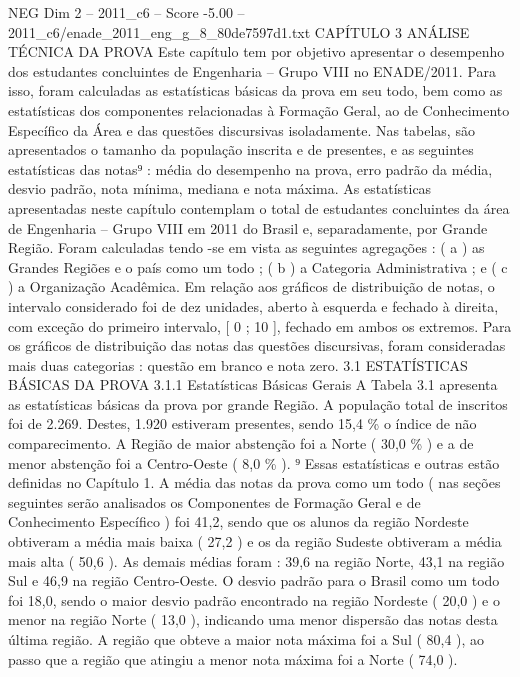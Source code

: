 \begin{textsample}{NEG Dim 2 – 2011\_c6 – Score -5.00 – 2011\_c6/enade\_2011\_eng\_g\_8\_80de7597d1.txt}  \label{ex:f2_neg_026}
CAPÍTULO 3 ANÁLISE TÉCNICA DA PROVA Este capítulo tem por objetivo apresentar o desempenho dos estudantes concluintes de Engenharia – Grupo VIII no ENADE/2011.
Para isso, foram calculadas as estatísticas básicas da prova em seu todo, bem como as estatísticas dos componentes relacionadas à Formação Geral, ao de Conhecimento Específico da Área e das questões discursivas isoladamente.
Nas tabelas, são apresentados o tamanho da população inscrita e de presentes, e as seguintes estatísticas das notas⁹ : média do desempenho na prova, erro padrão da média, desvio padrão, nota mínima, mediana e nota máxima.
As estatísticas apresentadas neste capítulo contemplam o total de estudantes concluintes da área de Engenharia – Grupo VIII em 2011 do Brasil e, separadamente, por Grande Região.
Foram calculadas tendo -se em vista as seguintes agregações : ( a ) as Grandes Regiões e o país como um todo ; ( b ) a Categoria Administrativa ; e ( c ) a Organização Acadêmica.
Em relação aos gráficos de distribuição de notas, o intervalo considerado foi de dez unidades, aberto à esquerda e fechado à direita, com exceção do primeiro intervalo, [ 0 ; 10 ], fechado em ambos os extremos.
Para os gráficos de distribuição das notas das questões discursivas, foram consideradas mais duas categorias : questão em branco e nota zero. 3.1 ESTATÍSTICAS BÁSICAS DA PROVA 3.1.1 Estatísticas Básicas Gerais A Tabela 3.1 apresenta as estatísticas básicas da prova por grande Região.
A população total de inscritos foi de 2.269.
Destes, 1.920 estiveram presentes, sendo 15,4 \% o índice de não comparecimento.
A Região de maior abstenção foi a Norte ( 30,0 \% ) e a de menor abstenção foi a Centro-Oeste ( 8,0 \% ). ⁹ Essas estatísticas e outras estão definidas no Capítulo 1.
A média das notas da prova como um todo ( nas seções seguintes serão analisados os Componentes de Formação Geral e de Conhecimento Específico ) foi 41,2, sendo que os alunos da região Nordeste obtiveram a média mais baixa ( 27,2 ) e os da região Sudeste obtiveram a média mais alta ( 50,6 ).
As demais médias foram : 39,6 na região Norte, 43,1 na região Sul e 46,9 na região Centro-Oeste.
O desvio padrão para o Brasil como um todo foi 18,0, sendo o maior desvio padrão encontrado na região Nordeste ( 20,0 ) e o menor na região Norte ( 13,0 ), indicando uma menor dispersão das notas desta última região.
A região que obteve a maior nota máxima foi a Sul ( 80,4 ), ao passo que a região que atingiu a menor nota máxima foi a Norte ( 74,0 ).

\end{textsample}
